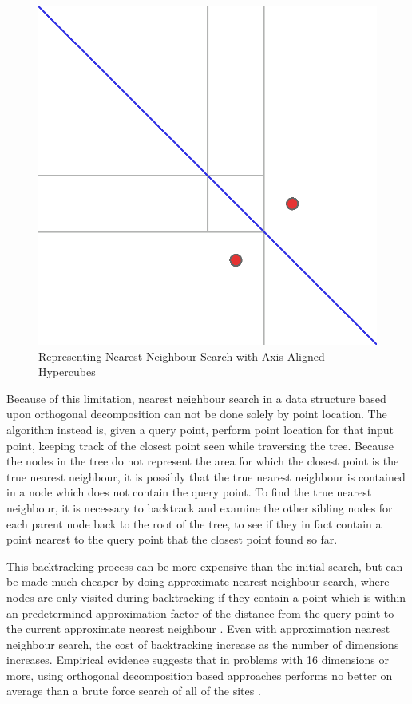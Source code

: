 \documentclass[mcs]{scsthesis}
\begin{document}
\begin{figure}
\begin{center}
\includegraphics[scale=0.5]{diagrams/no_finite_tree.eps}
\caption{Representing Nearest Neighbour Search with Axis Aligned Hypercubes}
\label{fig:no_finite_tree}
\end{center}
\end{figure}

Because of this limitation, nearest neighbour search in a data structure based
upon orthogonal decomposition can not be done solely by point location. The
algorithm instead is, given a query point, perform point location for that
input point, keeping track of the closest point seen while traversing the tree.
Because the nodes in the tree do not represent the area for which the closest
point is the true nearest neighbour, it is possibly that the true nearest
neighbour is contained in a node which does not contain the query point. To
find the true nearest neighbour, it is necessary to backtrack and examine the
other sibling nodes for each parent node back to the root of the tree, to see
if they in fact contain a point nearest to the query point that the closest
point found so far.

This backtracking process can be more expensive than the initial search, but
can be made much cheaper by doing approximate nearest neighbour search, where
nodes are only visited during backtracking if they contain a point which is
within an predetermined approximation factor of the distance from the query
point to the current approximate nearest neighbour \cite{app-ann}.  Even with
approximation nearest neighbour search, the cost of backtracking increase as
the number of dimensions increases. Empirical evidence suggests that in
problems with 16 dimensions or more, using orthogonal decomposition based
approaches performs no better on average than a brute force search of all of
the sites \cite{fastvector}.
\end{document}
